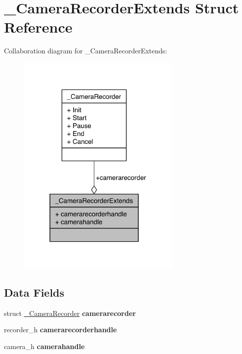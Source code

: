 \hypertarget{struct__CameraRecorderExtends}{\section{\-\_\-\-Camera\-Recorder\-Extends Struct Reference}
\label{struct__CameraRecorderExtends}
}


Collaboration diagram for \-\_\-\-Camera\-Recorder\-Extends\-:\nopagebreak
\begin{figure}[H]
\begin{center}
\leavevmode
\includegraphics[width=226pt]{d8/da7/struct__CameraRecorderExtends__coll__graph}
\end{center}
\end{figure}
\subsection*{Data Fields}
\begin{DoxyCompactItemize}
\item 
\hypertarget{struct__CameraRecorderExtends_af4cf6d238f7e59a61fd0ba13c39a10ad}{struct \hyperlink{struct__CameraRecorder}{\-\_\-\-Camera\-Recorder} {\bfseries camerarecorder}}\label{struct__CameraRecorderExtends_af4cf6d238f7e59a61fd0ba13c39a10ad}

\item 
\hypertarget{struct__CameraRecorderExtends_ad514124f62d6cded798098cfcd62ceb8}{recorder\-\_\-h {\bfseries camerarecorderhandle}}\label{struct__CameraRecorderExtends_ad514124f62d6cded798098cfcd62ceb8}

\item 
\hypertarget{struct__CameraRecorderExtends_a9330305d1f580a90135b6a03bea47bc7}{camera\-\_\-h {\bfseries camerahandle}}\label{struct__CameraRecorderExtends_a9330305d1f580a90135b6a03bea47bc7}

\end{DoxyCompactItemize}


